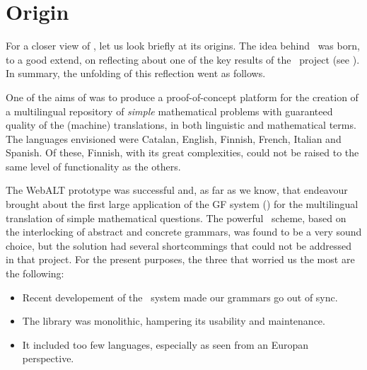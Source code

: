 \documentclass[adraft,copyright,creativecommons]{eptcs}
\begin{document}
\section{Origin}

For a closer view of \MGL, let us look briefly at its origins.  The
idea behind \MGL\ was born, to a good extend, on reflecting about one of
the key results of the \webalt\ project (see
\cite{Caprotti_multilingualdelivery, Caprotti06webalt!deliver, Nganga06}).  In
summary, the unfolding of this reflection went as follows.

One of the aims of \webalt{} was to produce a proof-of-concept
platform for the creation of a multilingual repository of \emph{simple}
mathematical problems with guaranteed quality of the (machine)
translations, in both linguistic and mathematical terms. The languages
envisioned were Catalan,
English,
Finnish,
French,
Italian and
Spanish.
Of these, Finnish, with its great complexities, could not be raised to
the same level of functionality as the others.

The WebALT prototype was successful and, as far as we know, that endeavour
brought about the first large application of the GF system (\cite{GF,Ranta11})
for the multilingual translation of simple mathematical questions.  The
powerful \GF\ scheme, based on the interlocking of abstract and
concrete grammars, was found to be a very sound choice, but the solution
had several shortcommings that could not be addressed in that project.
For the present purposes, the three that worried us the most are the
following:
\begin{itemize}
\item
Recent developement of the \GF\ system made our grammars go out of sync.
\item
The library was monolithic, hampering its usability and maintenance.
\item
It included too few languages, especially as seen from an Europan
perspective.
\end{itemize}
\end{document}

